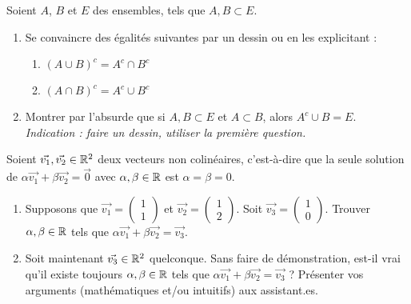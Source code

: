 \begin{exercice}
Soient $A$, $B$ et $E$ des ensembles, tels que $A,B \subset E$.
    \begin{enumerate}
        \item Se convaincre des égalités suivantes par un dessin ou en les explicitant :
        \begin{enumerate}
            \item $(A \cup B)^c = A^c \cap B^c$
            \item $(A \cap B)^c = A^c \cup B^c$
        \end{enumerate}

        \item Montrer par l'absurde que si $A,B \subset E$ et $A \subset B$, alors $A^c \cup B = E$.\\
        \textit{Indication : faire un dessin, utiliser la première question.} \\
    \end{enumerate}
\end{exercice}


\begin{exercice}
    Soient $\vec{v_1}, \vec{v_2} \in \mathbb{R}^2$ deux vecteurs non colinéaires, c'est-à-dire que la seule solution de $\alpha \vec{v_1} + \beta \vec{v_2} = \vec{0}$ avec $\alpha, \beta \in \mathbb{R}$ est $\alpha = \beta = 0$.
    \begin{enumerate}
        \item Supposons que $\vec{v_1} = \begin{pmatrix} 1 \\ 1 \end{pmatrix}$ et $\vec{v_2} = \begin{pmatrix} 1 \\ 2
        \end{pmatrix}$. Soit $\vec{v_3} = \begin{pmatrix} 1 \\ 0 \end{pmatrix}$. Trouver $\alpha, \beta \in \mathbb{R}$ tels que $\alpha \vec{v_1} + \beta \vec{v_2} = \vec{v_3}$.

        \item Soit maintenant $\vec{v_3} \in \mathbb{R}^2$ quelconque. Sans faire de démonstration, est-il vrai qu'il existe toujours $\alpha, \beta \in \mathbb{R}$ tels que $\alpha \vec{v_1} + \beta \vec{v_2} = \vec{v_3}$ ? Présenter vos arguments (mathématiques et/ou intuitifs) aux assistant.es.
    \end{enumerate}
\end{exercice}

